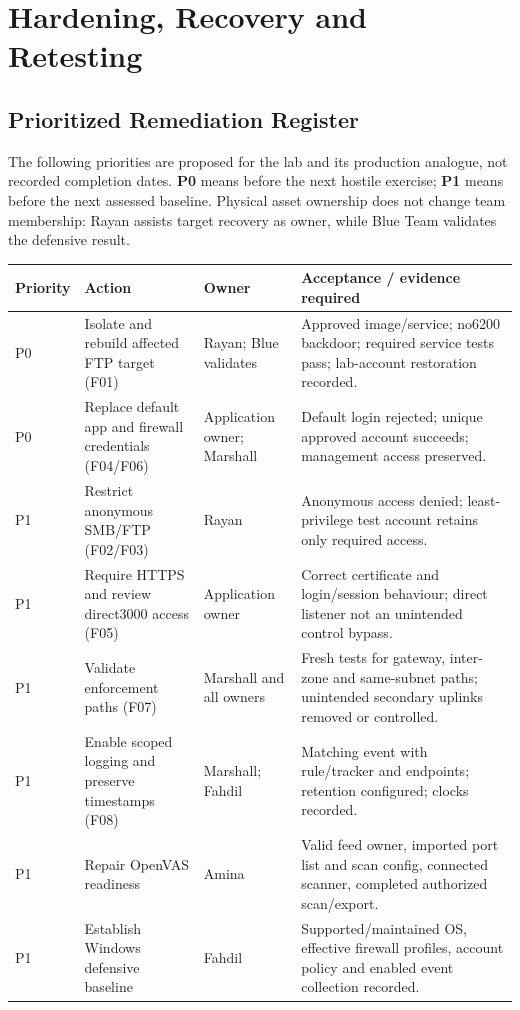 \documentclass[11pt,a4paper]{article}
\newcommand{\partheading}[2]{\clearpage\noindent{\small\bfseries\color{steel}#1}\par\section{#2}}
\begin{document}
\partheading{07 / RESPONSE PLAN}{Hardening, Recovery and Retesting}
\label{sec:hardening}
\subsection{Prioritized Remediation Register}
The following priorities are proposed for the lab and its production analogue, not recorded completion dates. \textbf{P0} means before the next hostile exercise; \textbf{P1} means before the next assessed baseline. Physical asset ownership does not change team membership: Rayan assists target recovery as owner, while Blue Team validates the defensive result.

\small
\begin{longtable}{@{}L{1.3cm}L{4.5cm}L{2.8cm}L{7.0cm}@{}}
\toprule
\textbf{Priority} & \textbf{Action} & \textbf{Owner} & \textbf{Acceptance / evidence required}\\
\midrule\endhead
P0 & Isolate and rebuild affected FTP target (F01) & Rayan; Blue validates & Approved image/service; no6200 backdoor; required service tests pass; lab-account restoration recorded.\\
P0 & Replace default app and firewall credentials (F04/F06) & Application owner; Marshall & Default login rejected; unique approved account succeeds; management access preserved.\\
P1 & Restrict anonymous SMB/FTP (F02/F03) & Rayan & Anonymous access denied; least-privilege test account retains only required access.\\
P1 & Require HTTPS and review direct3000 access (F05) & Application owner & Correct certificate and login/session behaviour; direct listener not an unintended control bypass.\\
P1 & Validate enforcement paths (F07) & Marshall and all owners & Fresh tests for gateway, inter-zone and same-subnet paths; unintended secondary uplinks removed or controlled.\\
P1 & Enable scoped logging and preserve timestamps (F08) & Marshall; Fahdil & Matching event with rule/tracker and endpoints; retention configured; clocks recorded.\\
P1 & Repair OpenVAS readiness & Amina & Valid feed owner, imported port list and scan config, connected scanner, completed authorized scan/export.\\
P1 & Establish Windows defensive baseline & Fahdil & Supported/maintained OS, effective firewall profiles, account policy and enabled event collection recorded.\\
\bottomrule
\end{longtable}
\normalsize
\end{document}
